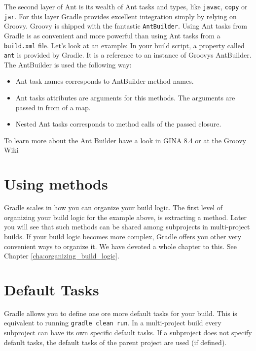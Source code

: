 The second layer of Ant is its wealth of Ant tasks and types, like \texttt{javac}, \texttt{copy} or \texttt{jar}. For this layer Gradle provides excellent integration simply by relying on Groovy. Groovy is shipped with the fantastic \texttt{AntBuilder}. Using Ant tasks from Gradle is as convenient and more powerful than using Ant tasks from a \texttt{build.xml} file. Let's look at an example:
In your build script, a property called \texttt{ant} is provided by Gradle. It is a reference to an instance of Groovys AntBuilder. The AntBuilder is used the following way:
\begin{itemize}
\item Ant task names corresponds to AntBuilder method names.
\item Ant tasks attributes are arguments for this methods. The arguments are passed in from of a map.
\item Nested Ant tasks corresponds to method calls of the passed closure.
\end{itemize}
To learn more about the Ant Builder have a look in GINA 8.4 or at the Groovy Wiki

\section{Using methods}
Gradle scales in how you can organize your build logic. The first level of organizing your build logic for the example above, is extracting a method.
Later you will see that such methods can be shared among subprojects in multi-project builds. If your build logic becomes more complex, Gradle offers you other very convenient ways to organize it. We have devoted a whole chapter to this. See Chapter \ref{cha:organizing_build_logic}. 

\section{Default Tasks} %
\label{sec:default_tasks}
Gradle allows you to define one ore more default tasks for your build. 
This is equivalent to running \texttt{gradle clean run}. In a multi-project build every subproject can have its own specific default tasks. If a subproject does not specify default tasks, the default tasks of the parent project are used (if defined).

